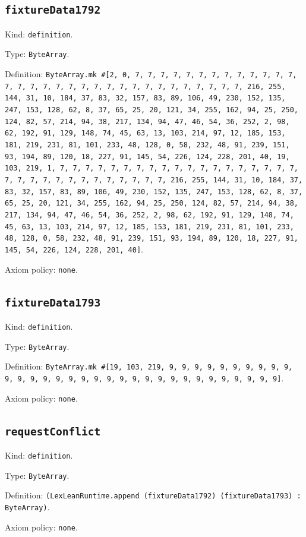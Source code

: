 \documentclass[11pt]{article}
\begin{document}
\subsection*{\texttt{fixtureData1792}}
\noindent Kind: \texttt{definition}.\par
\noindent Type: \texttt{ByteArray}.\par
\noindent Definition: \texttt{ByteArray.mk \#[2, 0, 7, 7, 7, 7, 7, 7, 7, 7, 7, 7, 7, 7, 7, 7, 7, 7, 7, 7, 7, 7, 7, 7, 7, 7, 7, 7, 7, 7, 7, 7, 7, 7, 216, 255, 144, 31, 10, 184, 37, 83, 32, 157, 83, 89, 106, 49, 230, 152, 135, 247, 153, 128, 62, 8, 37, 65, 25, 20, 121, 34, 255, 162, 94, 25, 250, 124, 82, 57, 214, 94, 38, 217, 134, 94, 47, 46, 54, 36, 252, 2, 98, 62, 192, 91, 129, 148, 74, 45, 63, 13, 103, 214, 97, 12, 185, 153, 181, 219, 231, 81, 101, 233, 48, 128, 0, 58, 232, 48, 91, 239, 151, 93, 194, 89, 120, 18, 227, 91, 145, 54, 226, 124, 228, 201, 40, 19, 103, 219, 1, 7, 7, 7, 7, 7, 7, 7, 7, 7, 7, 7, 7, 7, 7, 7, 7, 7, 7, 7, 7, 7, 7, 7, 7, 7, 7, 7, 7, 7, 7, 7, 7, 216, 255, 144, 31, 10, 184, 37, 83, 32, 157, 83, 89, 106, 49, 230, 152, 135, 247, 153, 128, 62, 8, 37, 65, 25, 20, 121, 34, 255, 162, 94, 25, 250, 124, 82, 57, 214, 94, 38, 217, 134, 94, 47, 46, 54, 36, 252, 2, 98, 62, 192, 91, 129, 148, 74, 45, 63, 13, 103, 214, 97, 12, 185, 153, 181, 219, 231, 81, 101, 233, 48, 128, 0, 58, 232, 48, 91, 239, 151, 93, 194, 89, 120, 18, 227, 91, 145, 54, 226, 124, 228, 201, 40]}.\par
\noindent Axiom policy: \texttt{none}.\par
\subsection*{\texttt{fixtureData1793}}
\noindent Kind: \texttt{definition}.\par
\noindent Type: \texttt{ByteArray}.\par
\noindent Definition: \texttt{ByteArray.mk \#[19, 103, 219, 9, 9, 9, 9, 9, 9, 9, 9, 9, 9, 9, 9, 9, 9, 9, 9, 9, 9, 9, 9, 9, 9, 9, 9, 9, 9, 9, 9, 9, 9, 9, 9]}.\par
\noindent Axiom policy: \texttt{none}.\par
\subsection*{\texttt{requestConflict}}
\noindent Kind: \texttt{definition}.\par
\noindent Type: \texttt{ByteArray}.\par
\noindent Definition: \texttt{(LexLeanRuntime.append (fixtureData1792) (fixtureData1793) : ByteArray)}.\par
\noindent Axiom policy: \texttt{none}.\par
\end{document}
